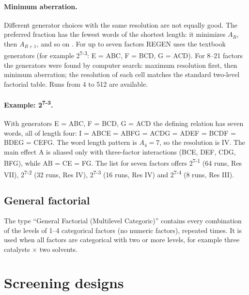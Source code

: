 \paragraph{Minimum aberration.} Different generator choices with the same resolution are not equally good. The
preferred fraction has the fewest words of the shortest length: it minimizes $A_R$, then $A_{R+1}$, and so on
\citep{fries1980}. For up to seven factors REGEN uses the textbook generators (for example 2\textsuperscript{7-3}:
E = ABC, F = BCD, G = ACD). For 8--21 factors the generators were found by computer search: maximum resolution
first, then minimum aberration; the resolution of each cell matches the standard two-level factorial table. Runs
from 4 to 512 are available.

\paragraph{Example: 2\textsuperscript{7-3}.} With generators E = ABC, F = BCD, G = ACD the defining relation has
seven words, all of length four: I = ABCE = ABFG = ACDG = ADEF = BCDF = BDEG = CEFG. The word length pattern is
$A_4 = 7$, so the resolution is IV. The main effect A is aliased only with three-factor interactions (BCE, DEF,
CDG, BFG), while AB = CE = FG. The  list for seven factors offers 2\textsuperscript{7-1} (64 runs,
Res VII), 2\textsuperscript{7-2} (32 runs, Res IV), 2\textsuperscript{7-3} (16 runs, Res IV) and
2\textsuperscript{7-4} (8 runs, Res III).

\subsection{General factorial}
The type ``General Factorial (Multilevel Categoric)'' contains every combination of the levels of 1--4 categorical
factors (no numeric factors), repeated  times. It is used when all factors are categorical with two
or more levels, for example three catalysts $\times$ two solvents.

\section{Screening designs}
\label{sec:ch03-screening}

